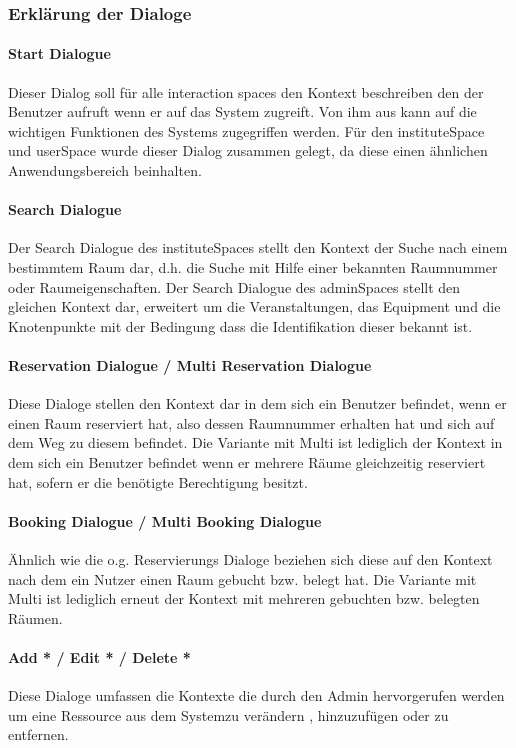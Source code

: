 \subsubsection*{Erklärung der Dialoge}
    \paragraph*{Start Dialogue}
        Dieser Dialog soll für alle interaction spaces den Kontext beschreiben den der
        Benutzer aufruft wenn er auf das System zugreift.
        Von ihm aus kann auf die wichtigen Funktionen des Systems zugegriffen werden.
        Für den instituteSpace und userSpace wurde dieser Dialog zusammen gelegt,
        da diese einen ähnlichen Anwendungsbereich beinhalten.

   \paragraph*{Search Dialogue}
        Der Search Dialogue des instituteSpaces stellt den Kontext der Suche nach einem
        bestimmtem Raum dar, d.h. die Suche mit Hilfe einer bekannten Raumnummer oder
        Raumeigenschaften.
        Der Search Dialogue des adminSpaces stellt den gleichen Kontext dar, erweitert
        um die Veranstaltungen, das Equipment und die Knotenpunkte mit der Bedingung
        dass die Identifikation dieser bekannt ist.

    \paragraph*{Reservation Dialogue / Multi Reservation Dialogue}
        Diese Dialoge stellen den Kontext dar in dem sich ein Benutzer befindet, wenn
        er einen Raum reserviert hat, also dessen Raumnummer erhalten hat und sich auf
        dem Weg zu diesem befindet. Die Variante mit Multi ist lediglich der Kontext
        in dem sich ein Benutzer befindet wenn er mehrere Räume gleichzeitig reserviert
        hat, sofern er die benötigte Berechtigung besitzt.

    \paragraph*{Booking Dialogue / Multi Booking Dialogue}
        Ähnlich wie die o.g. Reservierungs Dialoge beziehen sich diese auf den Kontext
        nach dem ein Nutzer einen Raum gebucht bzw. belegt hat. Die Variante mit Multi
        ist lediglich erneut der Kontext mit mehreren gebuchten bzw. belegten Räumen.

    \paragraph*{Add * / Edit * / Delete *}
        Diese Dialoge umfassen die Kontexte die durch den Admin hervorgerufen werden
        um eine Ressource aus dem Systemzu verändern , hinzuzufügen oder zu entfernen.
